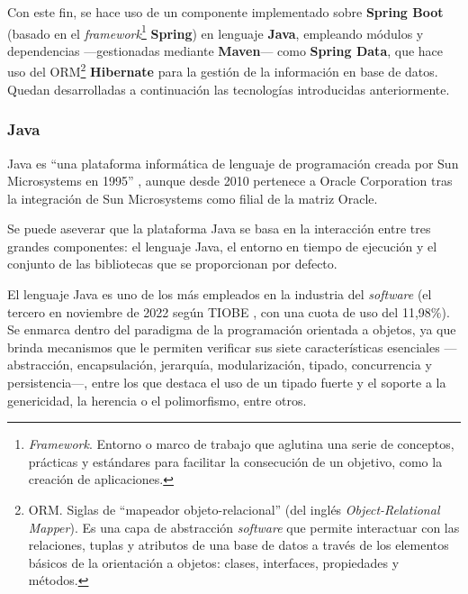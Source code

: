 Con este fin, se hace uso de un componente implementado sobre \textbf{Spring Boot} (basado en el \textit{framework}\footnote{\textit{Framework}. Entorno o marco de trabajo que aglutina una serie de conceptos, prácticas y estándares para facilitar la consecución de un objetivo, como la creación de aplicaciones.} \textbf{Spring}) en lenguaje \textbf{Java}, empleando módulos y dependencias ---gestionadas mediante \textbf{Maven}--- como \textbf{Spring Data}, que hace uso del ORM\footnote{ORM. Siglas de ``mapeador objeto-relacional'' (del inglés \textit{Object-Relational Mapper}). Es una capa de abstracción \textit{software} que permite interactuar con las relaciones, tuplas y atributos de una base de datos a través de los elementos básicos de la orientación a objetos: clases, interfaces, propiedades y métodos.} \textbf{Hibernate} para la gestión de la información en base de datos. Quedan desarrolladas a continuación las tecnologías introducidas anteriormente.

\subsubsection{Java}
Java es ``una plataforma informática de lenguaje de programación creada por Sun Microsystems en 1995'' \cite{Tec_Java}, aunque desde  2010 pertenece a Oracle Corporation tras la integración de Sun Microsystems como filial de la matriz Oracle.

Se puede aseverar que la plataforma Java se basa en la interacción entre tres grandes componentes: el lenguaje Java, el entorno en tiempo de ejecución y el conjunto de las bibliotecas que se proporcionan por defecto.

El lenguaje Java es uno de los más empleados en la industria del \textit{software} (el tercero en noviembre de 2022 según TIOBE \cite{TIOBE}, con una cuota de uso del 11,98\%). Se enmarca dentro del paradigma de la programación orientada a objetos, ya que brinda mecanismos que le permiten verificar sus siete características esenciales ---abstracción, encapsulación, jerarquía, modularización, tipado, concurrencia y persistencia---, entre los que destaca el uso de un tipado fuerte y el soporte a la genericidad, la herencia o el polimorfismo, entre otros.

